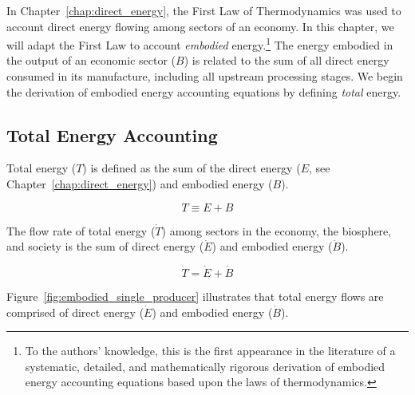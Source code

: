 In Chapter~\ref{chap:direct_energy}, the First Law of Thermodynamics
was used to account direct energy flowing among sectors of an economy.
In this chapter, we will adapt the First Law to account  
\emph{embodied} energy.\footnote{To the authors' knowledge, 
this is the first appearance in the literature 
of a systematic, detailed, and mathematically rigorous derivation 
of embodied energy accounting equations based upon the 
laws of thermodynamics.}
The energy embodied in the output of an economic sector ($B$)
is related to the sum of all direct energy
consumed in its manufacture, including 
all upstream processing stages. 
We begin the derivation of embodied energy accounting
equations by defining \emph{total} energy. 


\subsection{Total Energy Accounting}
\label{sec:total_energy_accounting}

Total energy ($T$) is defined as the sum of the direct energy 
($E$, see Chapter~\ref{chap:direct_energy}) 
and embodied energy ($B$).

\begin{equation} \label{eq:T_def}
	T \equiv E + B
\end{equation}

The flow rate of total energy ($\dot{T}$) among sectors in 
the economy, the biosphere, and society is the sum of
direct energy ($\dot{E}$) and embodied 
energy ($\dot{B}$).

\begin{equation} \label{eq:T_dot_def}
	\dot{T} = \dot{E} + \dot{B}
\end{equation}

\noindent Figure~\ref{fig:embodied_single_producer} illustrates
that total energy flows are comprised of
direct energy ($\dot{E}$) and embodied energy ($\dot{B}$). 

